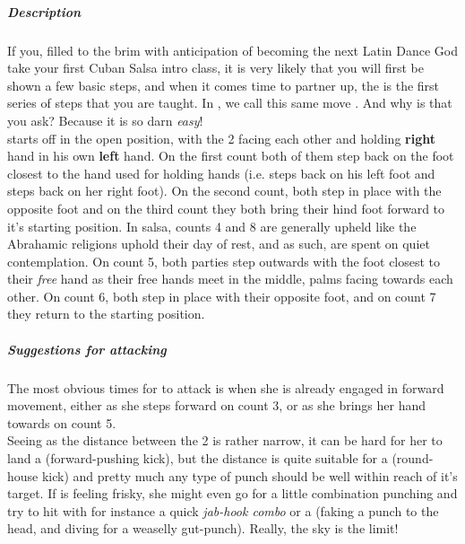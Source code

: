 \subparagraph*{Description}
If you, filled to the brim with anticipation of becoming the next Latin Dance God take your first Cuban Salsa intro class, it is very likely that you will first be shown a few basic steps, and when it comes time to partner up, the \salsaguapea is the first series of steps that you are taught. In \sovs, we call this same move \sovsguapea. And why is that you ask? Because it is so darn \textit{easy}!\\
\Sovsguapea starts off in the open position, with the 2 facing each other and \dude holding  \textbf{right} hand in his own \textbf{left} hand. On the first count both of them step back on the foot closest to the hand used for holding hands (i.e. \dude steps back on his left foot and \gal steps back on her right foot). On the second count, both step in place with the opposite foot and on the third count they both bring their hind foot forward to it's starting position. In salsa, counts 4 and 8 are generally upheld like the Abrahamic religions uphold their day of rest, and as such, are spent on quiet contemplation. On count 5, both parties step outwards with the foot closest to their \textit{free} hand as their free hands meet in the middle, palms facing towards each other. On count 6, both step in place with their opposite foot, and on count 7 they return to the starting position. 
\subparagraph*{Suggestions for attacking}
The most obvious times for \gal to attack is when she is already engaged in forward movement, either as she steps forward on count 3, or as she brings her hand towards \dude on count 5.\\
Seeing as the distance between the 2 is rather narrow, it can be hard for her to land a \atttrykker (forward-pushing kick), but the distance is quite suitable for a \attlosser (round-house kick) and pretty much any type of punch should be well within reach of it's target. If \gal is feeling frisky, she might even go for a little combination punching and try to hit \dude with for instance a quick \textit{jab-hook combo} or a \attflemming (faking a punch to the head, and diving for a weaselly gut-punch). Really, the sky is the limit!  


\pagebreak{}
